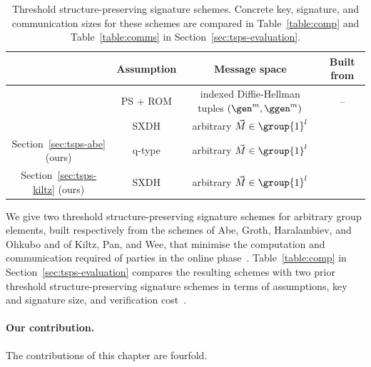 \begin{table}[!ht]
  \centering
  \begin{tabular}{ c || c | c | c }
   \toprule
    & Assumption & Message space & Built from \\
   \midrule
    \cite{AC:CKPSS23} & PS + ROM & indexed Diffie-Hellman tuples $(\gen^m, \ggen^m)$ & -- \\
    \cite{PKC:MMSST24} & SXDH & arbitrary $\vec{M} \in \group{1}^l$ & \cite{C:KilPanWee15} \\
    Section~\ref{sec:tsps-abe} (ours) & q-type & arbitrary $\vec{M} \in \group{1}^l$ & \cite{C:AGHO11} \\
    Section~\ref{sec:tsps-kiltz} (ours) & SXDH & arbitrary $\vec{M} \in \group{1}^l$ & \cite{C:KilPanWee15} \\
   \bottomrule
  \end{tabular}
  \caption{Threshold structure-preserving signature schemes. Concrete key,
  signature, and communication sizes for these schemes are compared in
  Table~\ref{table:comp} and Table~\ref{table:comms} in
  Section~\ref{sec:tsps-evaluation}.}
  \label{table:related-tsps}
\end{table}

We give two threshold structure-preserving signature schemes for arbitrary
group elements, built respectively from the schemes of Abe, Groth,
Haralambiev, and Ohkubo and of Kiltz, Pan, and Wee, that minimise the
computation and communication required of parties in the online
phase~\cite{C:AGHO11,C:KilPanWee15}. Table~\ref{table:comp} in
Section~\ref{sec:tsps-evaluation} compares the resulting schemes with two prior
threshold structure-preserving signature schemes in terms of assumptions,
key and signature size, and verification
cost~\cite{AC:CKPSS23,PKC:MMSST24}.

\paragraph{Our contribution.} The contributions of this chapter are fourfold.

